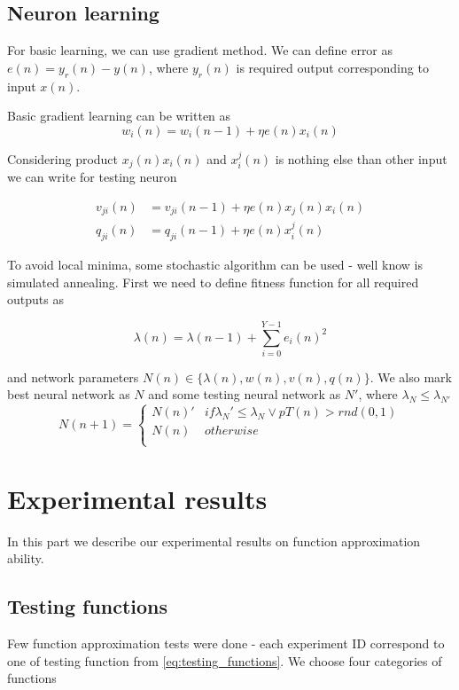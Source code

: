 \documentclass[10pt,a5paper]{article}
\begin{document}
\subsection{Neuron learning}

For basic learning, we can use gradient method.
We can define error as $e(n) = y_r(n) - y(n)$, where $y_r(n)$ is required output corresponding
to input $x(n)$.

Basic gradient learning can be written as
\begin{equation}
\label{eq:neuron_learning_1}
  w_i(n) =  w_i(n-1) + \eta e(n)x_i(n)
\end{equation}

Considering product $x_j(n)x_i(n)$ and $x_i^j(n)$ is nothing else than other input we can write for testing neuron

\begin{align}
\label{eq:neuron_learning_1}
  v_{ji}(n) &=  v_{ji}(n-1) + \eta e(n)x_j(n)x_i(n) \\
  q_{ji}(n) &=  q_{ji}(n-1) + \eta e(n)x_i^j(n)
\end{align}

To avoid local minima, some stochastic algorithm can be used - well know is simulated annealing.
First we need to define fitness function for all required outputs as

\begin{equation}
\label{eq:fitness}
  \lambda(n) = \lambda(n-1) + \sum_{i = 0}^{Y-1} e_i(n)^2
\end{equation}

and network parameters $N(n) \in \{\lambda(n), w(n), v(n), q(n)\}$.
We also mark best neural network as $N$ and some testing neural network as $N'$,
where $\lambda_N \leq \lambda_{N'}$
\begin{equation}
 N(n+1) =
  \begin{cases}
    N(n)' &  if \lambda_N' \le \lambda_{N} \lor pT(n) > rnd(0, 1)\\
    N(n)  &  otherwise\\
  \end{cases}
\end{equation}


\section{Experimental results}

In this part we describe our experimental results on function approximation ability.

\subsection{Testing functions}
Few function approximation tests were done - each experiment ID correspond to one
of testing function from \ref{eq:testing_functions}. We choose four categories of functions
\end{document}
